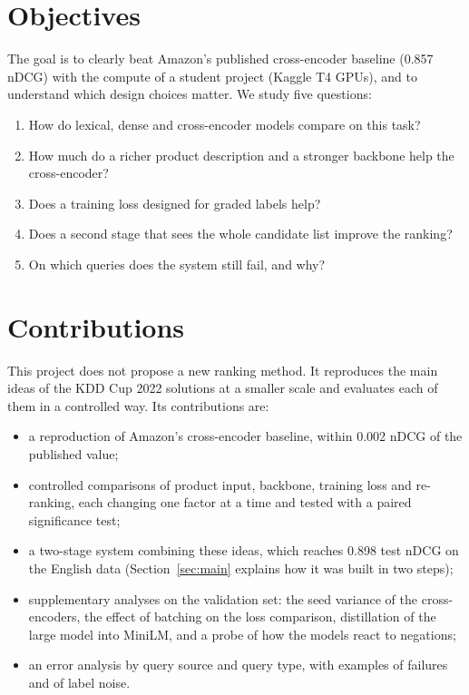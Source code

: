 \documentclass[12pt,a4paper]{report}
\begin{document}
\section{Objectives}
The goal is to clearly beat Amazon's published cross-encoder baseline (0.857 nDCG) with the compute of a student project (Kaggle T4 GPUs), and to understand which design choices matter. We study five questions:
\begin{enumerate}[label=\textbf{Q\arabic*}]
  \item How do lexical, dense and cross-encoder models compare on this task?
  \item How much do a richer product description and a stronger backbone help the cross-encoder?
  \item Does a training loss designed for graded labels help?
  \item Does a second stage that sees the whole candidate list improve the ranking?
  \item On which queries does the system still fail, and why?
\end{enumerate}

\section{Contributions}
This project does not propose a new ranking method. It reproduces the main ideas of the KDD Cup 2022 solutions at a smaller scale and evaluates each of them in a controlled way. Its contributions are:
\begin{itemize}
  \item a reproduction of Amazon's cross-encoder baseline, within 0.002 nDCG of the published value;
  \item controlled comparisons of product input, backbone, training loss and re-ranking, each changing one factor at a time and tested with a paired significance test;
  \item a two-stage system combining these ideas, which reaches 0.898 test nDCG on the English data (Section~\ref{sec:main} explains how it was built in two steps);
  \item supplementary analyses on the validation set: the seed variance of the cross-encoders, the effect of batching on the loss comparison, distillation of the large model into MiniLM, and a probe of how the models react to negations;
  \item an error analysis by query source and query type, with examples of failures and of label noise.
\end{itemize}
\end{document}
